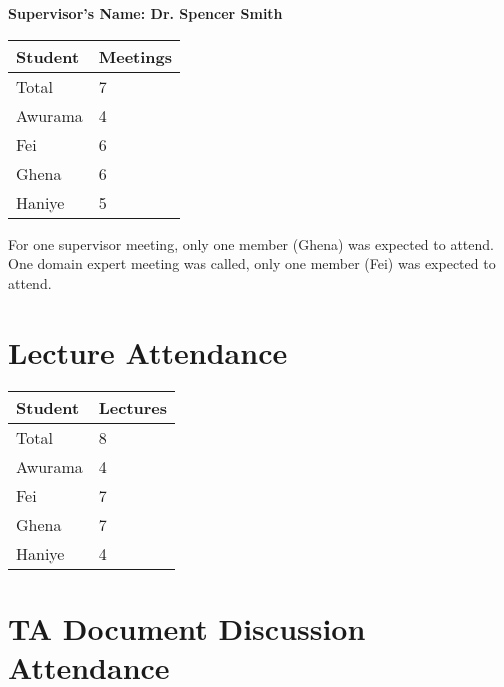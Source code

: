 \documentclass{article}
\begin{document}
\noindent \textbf{Supervisor's Name: Dr. Spencer Smith}

\begin{table}[H]
\centering
\begin{tabular}{ll}
\toprule
\textbf{Student} & \textbf{Meetings}\\
\midrule
Total & 7\\
Awurama & 4\\
Fei & 6\\
Ghena & 6\\
Haniye & 5\\
\bottomrule
\end{tabular}
\end{table}

For one supervisor meeting, only one member (Ghena) was expected to attend.
One domain expert meeting was called, only one member (Fei) was expected to attend.
\section{Lecture Attendance}



\begin{table}[H]
\centering
\begin{tabular}{ll}
\toprule
\textbf{Student} & \textbf{Lectures}\\
\midrule
Total & 8\\
Awurama & 4\\
Fei & 7\\
Ghena & 7\\
Haniye & 4\\
\bottomrule
\end{tabular}
\end{table}

\section{TA Document Discussion Attendance}
\end{document}
